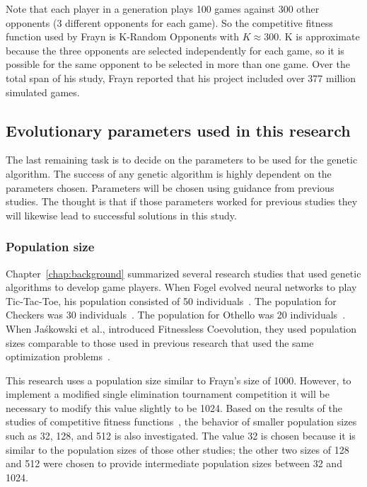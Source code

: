 Note that each player in a generation plays 100 games against 300 other
opponents (3 different opponents for each game). So the competitive fitness
function used by Frayn is K-Random Opponents with \(K\approx300\). K is
approximate because the three opponents are selected independently for each
game, so it is possible for the same opponent to be selected in more than one
game. Over the total span of his study, Frayn reported that his project included
over 377 million simulated games.

\subsection{Evolutionary parameters used in this research}

The last remaining task is to decide on the parameters to be used for the
genetic algorithm. The success of any genetic algorithm is highly dependent on
the parameters chosen. Parameters will be chosen using guidance from previous
studies. The thought is that if those parameters worked for previous studies
they will likewise lead to successful solutions in this study.

\subsubsection{Population size}

Chapter~\ref{chap:background} summarized several research studies that used
genetic algorithms to develop game players. When Fogel evolved neural networks
to play Tic-Tac-Toe, his population consisted of 50
individuals~\cite{Fogel1993}. The population for Checkers was 30
individuals~\cite{Fogel2000Anaconda,journals/tec/ChellapillaF01}.
The population for Othello was 20 individuals~\cite{ChongTW05}. When
Ja\'{s}kowski et al., introduced Fitnessless Coevolution, they used population
sizes comparable to those used in previous research that used the same
optimization problems~\cite{Jaskowski:2008:FC:1389095.1389161}.

This research uses a population size similar to Frayn's size of 1000. However,
to implement a modified single elimination tournament competition it will be
necessary to modify this value slightly to be 1024. Based on the results of the
studies of competitive fitness functions~\cite{Angeline:1993:CEE:645513.657590,
Panait02acomparative, Jaskowski:2008:FC:1389095.1389161}, the behavior of
smaller population sizes such as 32, 128, and 512 is also investigated.
The value 32 is chosen because it is similar to the population sizes of those
other studies; the other two sizes of 128 and 512 were chosen to provide
intermediate population sizes between 32 and 1024.

